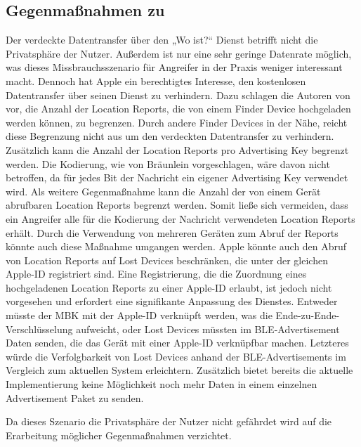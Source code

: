 \subsection{Gegenmaßnahmen zu }
Der verdeckte Datentransfer über den „Wo ist?“ Dienst betrifft nicht die Privatsphäre der Nutzer.
Außerdem ist nur eine sehr geringe Datenrate möglich, was dieses Missbrauchsszenario für Angreifer in der Praxis weniger interessant macht.
Dennoch hat Apple ein berechtigtes Interesse, den kostenlosen Datentransfer über seinen Dienst zu verhindern.
Dazu schlagen die Autoren von \cite{Tonetto_FindMy} vor, die Anzahl der Location Reports, die von einem Finder Device hochgeladen werden können, zu begrenzen.
Durch andere Finder Devices in der Nähe, reicht diese Begrenzung nicht aus um den verdeckten Datentransfer zu verhindern.
Zusätzlich kann die Anzahl der Location Reports pro Advertising Key begrenzt werden.
Die Kodierung, wie von Bräunlein \cite{braeunlein_sendmy} vorgeschlagen, wäre davon nicht betroffen, da für jedes Bit der Nachricht ein eigener Advertising Key verwendet wird.
Als weitere Gegenmaßnahme kann die Anzahl der von einem Gerät abrufbaren Location Reports begrenzt werden.
Somit ließe sich vermeiden, dass ein Angreifer alle für die Kodierung der Nachricht verwendeten Location Reports erhält.
Durch die Verwendung von mehreren Geräten zum Abruf der Reports könnte auch diese Maßnahme umgangen werden.
Apple könnte auch den Abruf von Location Reports auf Lost Devices beschränken, die unter der gleichen Apple-ID registriert sind.
Eine Registrierung, die die Zuordnung eines hochgeladenen Location Reports zu einer Apple-ID erlaubt, ist jedoch nicht vorgesehen und erfordert eine signifikante Anpassung des Dienstes.
Entweder müsste der \ac{MBK} mit der Apple-ID verknüpft werden, was die Ende-zu-Ende-Verschlüsselung aufweicht, oder Lost Devices müssten im \ac{BLE}-Advertisement Daten senden, die das Gerät mit einer Apple-ID verknüpfbar machen.
Letzteres würde die Verfolgbarkeit von Lost Devices anhand der \ac{BLE}-Advertisements im Vergleich zum aktuellen System erleichtern.
Zusätzlich bietet bereits die aktuelle Implementierung keine Möglichkeit noch mehr Daten in einem einzelnen Advertisement Paket zu senden.

Da dieses Szenario die Privatsphäre der Nutzer nicht gefährdet wird auf die Erarbeitung möglicher Gegenmaßnahmen verzichtet.

